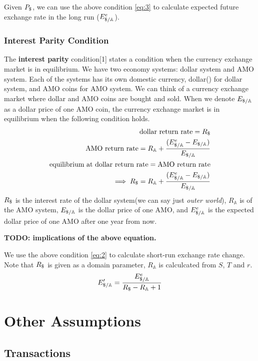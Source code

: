 \documentclass[a4paper,11pt]{scrartcl}
\newcommand{\usd}{\text{\textdollar}}
\newcommand{\amom}{\mathbb{A}}
\begin{document}
Given $P_\usd$, we can use the above condition \eqref{eq:3} to calculate
expected future exchange rate in the long run ($E^e_{\usd/\amom}$).

\subsubsection{Interest Parity Condition}
The \textbf{interest parity} condition[1] states a condition when the currency
exchange market is in equilibrium. We have two economy systems: dollar system
and AMO system. Each of the systems has its own domestic currency, dollar(\usd)
for dollar system, and AMO coins for AMO system. We can think of a currency
exchange market where dollar and AMO coins are bought and sold. When we denote
$E_{\usd/\amom}$ as a dollar price of one AMO coin, the currency exchange market
is in equilibrium when the following condition holds.
\begin{eqnarray}
	\text{dollar return rate} = R_\usd \\
	\text{AMO return rate} = R_\amom + \frac{(E^e_{\usd/\amom} - E_{\usd/\amom})}
	{E_{\usd/\amom}} \\
	\text{equilibrium at\ } \text{dollar return rate} = \text{AMO return rate} \\
	\implies R_\usd = R_\amom + \frac{(E^e_{\usd/\amom} - E_{\usd/\amom})}
	{E_{\usd/\amom}} \label{eq:2}
\end{eqnarray}
$R_\usd$ is the interest rate of the dollar system(we can say just
\emph{outer world}), $R_\amom$ is of the AMO system, $E_{\usd/\amom}$ is the
dollar price of one AMO, and $E^e_{\usd/\amom}$ is the expected dollar price of
one AMO after one year from now.

\textbf{TODO: implications of the above equation.}

We use the above condition \eqref{eq:2} to calculate short-run exchange rate
change. Note that $R_\usd$ is given as a domain parameter, $R_\amom$ is
calculcated from $S$, $T$ and $r$.
\begin{equation}
	E'_{\usd/\amom} = \frac{E^e_{\usd/\amom}}{R_\usd - R_\amom + 1}
\end{equation}

\section{Other Assumptions}

\subsection{Transactions}
\end{document}
